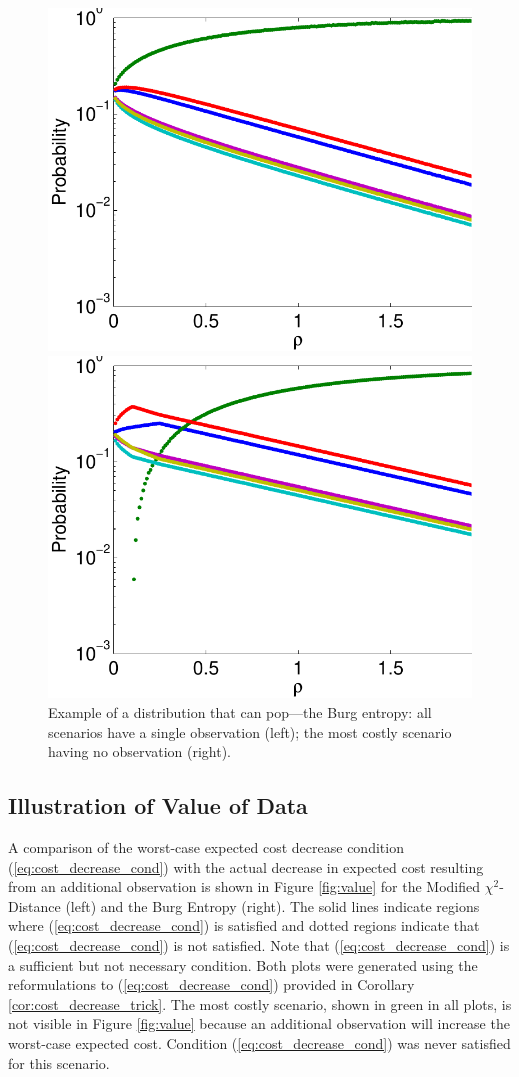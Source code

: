 \documentclass[opre,nonblindrev]{informs3} %
\begin{document}
\begin{figure}[h]
	\FIGURE
	{%
		\includegraphics*[width=.42\textwidth]{images/burg}%
		\includegraphics*[width=.42\textwidth]{images/burg_zero}%
	}
	{
		Example of a distribution that can pop---the Burg entropy: 
		all scenarios have a single observation (left); 
		 the most costly scenario having no observation (right).
		\label{fig:pop}
	}
	{}
\end{figure}

\subsection{Illustration of Value of Data}
\label{ssec:numerical_value_of_data}

A comparison of the worst-case expected cost decrease condition (\ref{eq:cost_decrease_cond}) with the actual decrease in expected cost resulting from an additional observation is shown in Figure \ref{fig:value} for the Modified $\chi^2$-Distance (left) and the Burg Entropy (right).
The solid lines indicate regions where (\ref{eq:cost_decrease_cond}) is satisfied and dotted regions indicate that (\ref{eq:cost_decrease_cond}) is not satisfied.
Note that (\ref{eq:cost_decrease_cond}) is a sufficient but not necessary condition.
Both plots were generated using the reformulations to (\ref{eq:cost_decrease_cond}) provided in Corollary \ref{cor:cost_decrease_trick}.
The most costly scenario, shown in green in all plots, is not visible in Figure \ref{fig:value} because an additional observation will increase the worst-case expected cost.
Condition (\ref{eq:cost_decrease_cond}) was never satisfied for this scenario.
\end{document}
